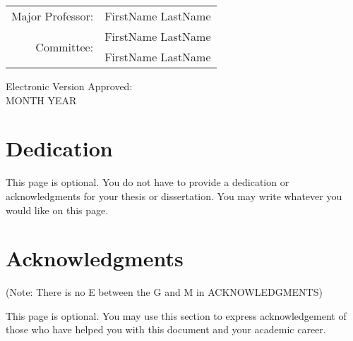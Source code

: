 \documentclass[11pt]{report}
\begin{document}
\vspace*{\fill}
\begin{center}
\begin{tabular}{rl}
Major Professor: 			   & FirstName LastName \\
\multirow[t]{2}{*}{Committee:} & FirstName LastName \\
							   & FirstName LastName
\end{tabular}
\end{center}
\vspace*{\fill}
\bigskip
Electronic Version Approved: \\
MONTH YEAR

\newpage

\chapter*{Dedication}

This page is optional. You do not have to provide a dedication or acknowledgments for your thesis or dissertation. You may write whatever you would like on this page.


\chapter*{Acknowledgments}
(Note: There is no E between the G and M in ACKNOWLEDGMENTS)

This page is optional. You may use this section to express acknowledgement of those who have helped you with this document and your academic career.

\newpage

\renewcommand{\contentsname}{\hfill\normalfont\normalsize TABLE OF CONTENTS\hfill}

\tableofcontents



\cleardoublepage
{}
{}
\renewcommand{\listtablename}{\hfill\normalfont\normalsize\ LIST OF TABLES\hfill}
\listoftables
\end{document}
